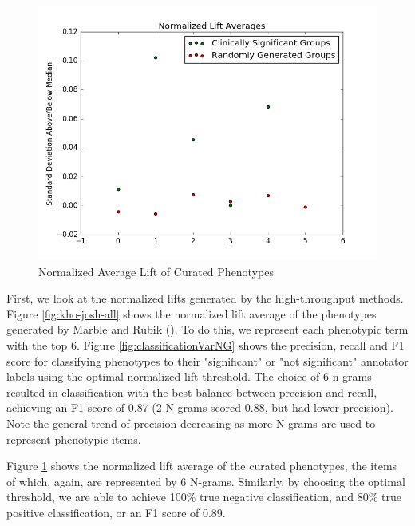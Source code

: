 \documentclass{sig-alternate-05-2015}
\begin{document}
\begin{figure} [t]
\centering
\includegraphics[width=\linewidth] {normalizedLiftAvg_labeled_Ordered.png}
\caption{Normalized Average Lift of Curated Phenotypes}
\label{fig:curatedPhenos}
\end{figure}


First, we look at the normalized lifts generated by the high-throughput methods. Figure \ref{fig:kho-josh-all} shows the normalized lift average of the phenotypes generated by Marble and Rubik (\cite {Ho:2014jc,Ho:2014da, wang2015rubik}). 
To do this, we represent each phenotypic term with the top 6. Figure \ref{fig:classificationVarNG} shows the precision, recall and F1 score for classifying phenotypes to their "significant" or "not significant" annotator labels using the optimal normalized lift threshold. 
The choice of 6 n-grams resulted in classification with the best balance between precision and recall, achieving an F1 score of 0.87 (2 N-grams scored 0.88, but had lower precision). Note the general trend of precision decreasing as more N-grams are used to represent phenotypic items.

Figure \ref{fig:curatedPhenos} shows the normalized lift average of the curated phenotypes, the items of which, again, are represented by 6 N-grams. Similarly, by choosing the optimal threshold, we are able to achieve 100\% true negative classification, and 80\% true positive classification, or an F1 score of 0.89.
\end{document}
